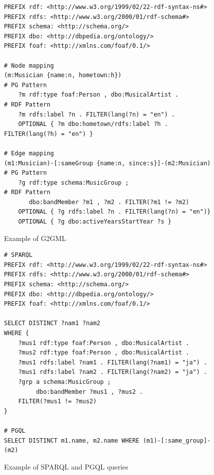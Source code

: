 \documentclass[runningheads]{llncs}
\begin{document}
\begin{figure}[!t]
\vspace{2mm}
\begin{scriptsize}
\begin{verbatim}
PREFIX rdf: <http://www.w3.org/1999/02/22-rdf-syntax-ns#>
PREFIX rdfs: <http://www.w3.org/2000/01/rdf-schema#>
PREFIX schema: <http://schema.org/>
PREFIX dbo: <http://dbpedia.org/ontology/>
PREFIX foaf: <http://xmlns.com/foaf/0.1/>
 
# Node mapping
(m:Musician {name:n, hometown:h})                            # PG Pattern
    ?m rdf:type foaf:Person , dbo:MusicalArtist .            # RDF Pattern
    ?m rdfs:label ?n . FILTER(lang(?n) = "en") .
    OPTIONAL { ?m dbo:hometown/rdfs:label ?h . FILTER(lang(?h) = "en") }
 
# Edge mapping
(m1:Musician)-[:sameGroup {name:n, since:s}]-(m2:Musician)  # PG Pattern
    ?g rdf:type schema:MusicGroup ;                          # RDF Pattern
       dbo:bandMember ?m1 , ?m2 . FILTER(?m1 != ?m2)
    OPTIONAL { ?g rdfs:label ?n . FILTER(lang(?n) = "en")}
    OPTIONAL { ?g dbo:activeYearsStartYear ?s }
\end{verbatim}
\end{scriptsize}
\caption{Example of G2GML}
\label{fig:g2gml}
\end{figure}
 
\begin{figure}[!t]
\vspace{2mm}
\begin{scriptsize}
\begin{verbatim}
# SPARQL
PREFIX rdf: <http://www.w3.org/1999/02/22-rdf-syntax-ns#>
PREFIX rdfs: <http://www.w3.org/2000/01/rdf-schema#>
PREFIX schema: <http://schema.org/>
PREFIX dbo: <http://dbpedia.org/ontology/>
PREFIX foaf: <http://xmlns.com/foaf/0.1/>
 
SELECT DISTINCT ?nam1 ?nam2
WHERE {
    ?mus1 rdf:type foaf:Person , dbo:MusicalArtist .
    ?mus2 rdf:type foaf:Person , dbo:MusicalArtist .
    ?mus1 rdfs:label ?nam1 . FILTER(lang(?nam1) = "ja") .
    ?mus1 rdfs:label ?nam2 . FILTER(lang(?nam2) = "ja") .
    ?grp a schema:MusicGroup ;
         dbo:bandMember ?mus1 , ?mus2 .
    FILTER(?mus1 != ?mus2)
}
 
# PGQL
SELECT DISTINCT m1.name, m2.name WHERE (m1)-[:same_group]-(m2)
\end{verbatim}
\end{scriptsize}
\caption{Example of SPARQL and PGQL queries}
\label{fig:sparql}
\end{figure}
 
\end{document}
